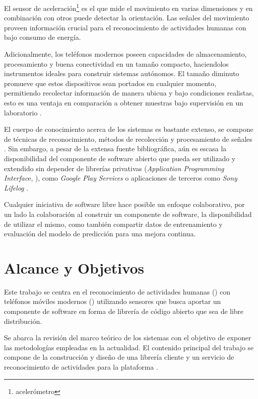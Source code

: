 El sensor de aceleración\footnote{acelerómetro} es el que mide el
movimiento en varias dimensiones y en combinación con otros puede
detectar la orientación. Las señales del movimiento proveen información
crucial para el reconocimiento de actividades humanas con bajo consumo
de energía.

Adicionalmente, los teléfonos modernos poseen capacidades de almacenamiento,
procesamiento y buena conectividad en un tamaño compacto, haciendolos
instrumentos ideales para construir sistemas autónomos. El tamaño
diminuto promueve que estos dispositivos sean portados en cualquier
momento, permitiendo recolectar información de manera ubicua y bajo
condiciones realistas, esto es una ventaja en comparación a obtener
muestras bajo supervisión en un laboratorio \cite{Bao2004}. 

El cuerpo de conocimiento acerca de los sistemas  es bastante
extenso, se compone de técnicas de reconocimiento, métodos de recolección
y procesamiento de señales \cite{LaraLabrador2012,Kwapisz2011}. Sin
embargo, a pesar de la extensa fuente bibliográfica, aún es escasa
la disponibilidad del componente de software abierto que pueda ser
utilizado y extendido sin depender de librerías privativas (\emph{Application
Programming Interfac}e, ), como \emph{Google Play Services}
\cite{Google2016l} o aplicaciones de terceros como \emph{Sony Lifelog}
\cite{Sony2016l}.

Cualquier iniciativa de software libre hace posible un enfoque colaborativo,
por un lado la colaboración al construir un componente de software,
la disponibilidad de utilizar el mismo, como también compartir datos
de entrenamiento y evaluación del modelo de predicción para una mejora
continua.

\section{Alcance y Objetivos}

\label{sec13:alcance-y-objetivos}Este trabajo se centra en el reconocimiento
de actividades humanas () con teléfonos móviles modernos
() utilizando sensores que busca aportar un componente
de software en forma de librería de código abierto que sea de libre
distribución. 

Se abarca la revisión del marco teórico de los sistemas 
con el objetivo de exponer las metodologías empleadas en la actualidad.
El contenido principal del trabajo se compone de la construcción y
diseño de una librería cliente y un servicio de reconocimiento de
actividades para la plataforma \emph{}. 


